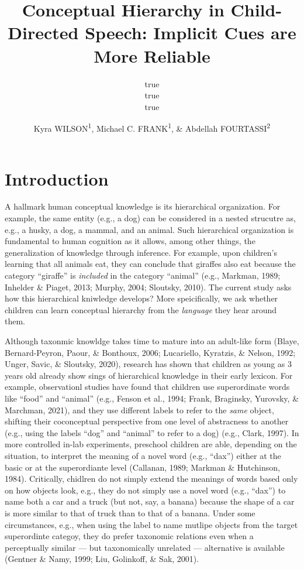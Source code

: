 \documentclass[english,,man]{apa6}
\title{Conceptual Hierarchy in Child-Directed Speech: Implicit Cues are More Reliable}
\author{true \\ true \\ true}
\date{}
\author{Kyra WILSON\textsuperscript{1}, Michael C. FRANK\textsuperscript{1}, \& Abdellah FOURTASSI\textsuperscript{2}}
\affiliation{
\vspace{0.5cm}
\textsuperscript{1} Department of Psychology, Stanford University\\\textsuperscript{2} Department of Computer Science, Aix-Marseille University}
\begin{document}
\maketitle

\hypertarget{introduction}{%
\section{Introduction}\label{introduction}}

A hallmark human conceptual knowledge is its hierarchical organization. For example, the same entity (e.g., a dog) can be considered in a nested strucutre as, e.g., a husky, a dog, a mammal, and an animal. Such hierarchical organization is fundamental to human cognition as it allows, among other things, the generalization of knowledge through inference. For example, upon children's learning that all animals eat, they can conclude that giraffes also eat because the category \enquote{giraffe} is \emph{included} in the category \enquote{animal} (e.g., Markman, 1989; Inhelder \& Piaget, 2013; Murphy, 2004; Sloutsky, 2010). The current study asks how this hierarchical kniwledge develops? More speicifically, we ask whether children can learn conceptual hierarchy from the \emph{language} they hear around them.

Although taxonmic knowldge takes time to mature into an adult-like form (Blaye, Bernard-Peyron, Paour, \& Bonthoux, 2006; Lucariello, Kyratzis, \& Nelson, 1992; Unger, Savic, \& Sloutsky, 2020), research has shown that children as young as 3 years old already show sings of hierarchical knowledge in their early lexicon. For example, observationl studies have found that children use superordinate words like \enquote{food} and \enquote{animal} (e.g., Fenson et al., 1994; Frank, Braginsky, Yurovsky, \& Marchman, 2021), and they use different labels to refer to the \emph{same} object, shifting their coconceptual perspective from one level of abstracness to another (e.g., using the labels \enquote{dog} and \enquote{animal} to refer to a dog) (e.g., Clark, 1997). In more controlled in-lab experiments, preschool children are able, depending on the situation, to interpret the meaning of a novel word (e.g., \enquote{dax}) either at the basic or at the superordiante level (Callanan, 1989; Markman \& Hutchinson, 1984). Critically, chidlren do not simply extend the meanings of words based only on how objects look, e.g., they do not simply use a novel word (e.g., \enquote{dax}) to name both a car and a truck (but not, say, a banana) because the shape of a car is more similar to that of truck than to that of a banana. Under some circumstances, e.g., when using the label to name mutlipe objects from the target superordinte categoy, they do prefer taxonomic relations even when a perceptually similar --- but taxonomically unrelated --- alternative is available (Gentner \& Namy, 1999; Liu, Golinkoff, \& Sak, 2001).
\end{document}
